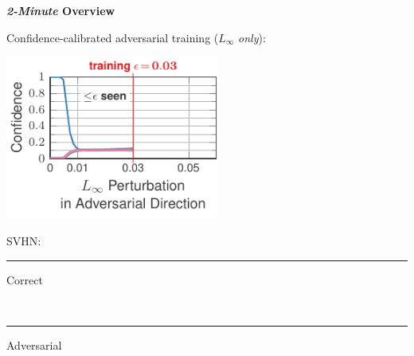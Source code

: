 \documentclass[64pt]{beamer}
\begin{document}
	\begin{frame}[t]{\bfseries \textit{2-Minute} Overview}
		\Large
		
	    Confidence-calibrated adversarial training ($L_\infty$ \emph{only}):
		
		\vskip -0.25cm
		\begin{minipage}[t]{0.7\textwidth}
			\vspace*{0px}
			\hfill
			\includegraphics[width=7cm]{fig/introduction/ours10_1_adversarial_seen}
		\end{minipage}
		\hfill
		\begin{minipage}[t]{0.28\textwidth}
			\vspace*{15px}
			
			\begin{tcolorbox}[
				left=0pt,
				right=0pt,
				top=0pt,
				bottom=0pt,
				colback=gray!12!white,
				colframe=gray!12!white,
				width=1\textwidth, 
				enlarge left by=0mm,
				boxsep=5pt,
				arc=0pt,outer arc=0pt,
				boxrule=1pt,
				]
				\large\color{MPIIblack}
				SVHN:\\
				\textcolor{colorbrewer2}{{\rule[4pt]{10pt}{2pt} Correct}}\\ \textcolor{colorbrewer8}{{\rule[4pt]{10pt}{2pt} Adversarial}}
			\end{tcolorbox}
		\end{minipage}
	\end{frame}
\end{document}
